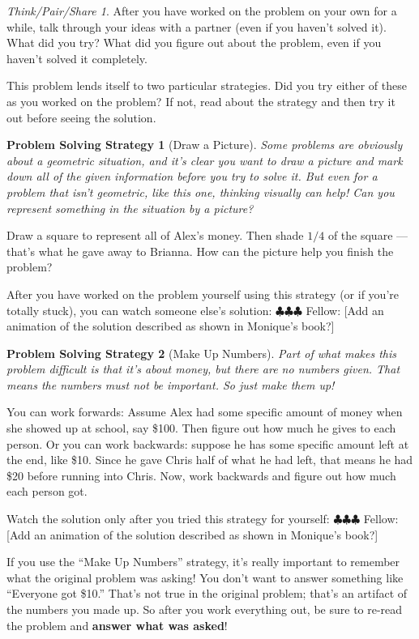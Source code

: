 \documentclass[10pt, reqno]{amsart}
\newtheorem{ps}{Problem Solving Strategy}
\theoremstyle{remark}
\newtheorem*{thinkpair*}{Think/Pair/Share}
\theoremstyle{definition}
\numberwithin{equation}{section}  %
\newcommand{\fellow}[1]{{\color{magenta} \sf $\clubsuit\clubsuit\clubsuit$ Fellow: [#1]}}
\begin{document}
\begin{thinkpair*}
After you have worked on the problem on your own for a while, talk through your ideas with a partner (even if you haven't solved it).  What did you try?   What did you figure out about the problem, even if you haven't solved it completely.
\end{thinkpair*}


This problem lends itself to two particular strategies.  Did you try either of these as you worked on the problem?  If not, read about the strategy and then try it out before seeing the solution.

\begin{ps}[Draw a Picture]
Some problems are obviously about a geometric situation, and it's clear you want to draw a picture and mark down all of the given information before you try to solve it.  But even for a problem that isn't geometric, like this one, thinking visually can help!  Can you represent something in the situation by a picture?  
\end{ps}

Draw a square to represent all of Alex's money.  Then shade $1/4$ of the square --- that's what he gave away to Brianna.  How can the picture help you finish the problem?

After you have worked on the problem yourself using this strategy (or if you're totally stuck), you can watch someone else's solution:
\fellow{Add an animation of the solution described as shown in Monique's book?}


\begin{ps}[Make Up Numbers]
Part of what makes this problem difficult is that it's about money, but there are no numbers given.  That means the numbers must not be important.  So just make them up!  
\end{ps}

You can  work forwards: Assume Alex had some specific amount of money when she showed up at school, say \$100.  Then figure out how much he gives to each person.  Or you can work backwards: suppose he has some specific amount left at the end, like \$10.  Since he gave Chris half of what he had left, that means he had \$20 before running into Chris.   Now, work backwards and figure out how much each person got.

Watch the solution only after you tried this strategy for yourself:
\fellow{Add an animation of the solution described as shown in Monique's book?}

If you use the ``Make Up Numbers'' strategy, it's really important to remember what the original problem was asking!  You don't want to answer something like ``Everyone got \$10.''  That's not true in the original problem; that's an artifact of the numbers you made up.  So after you work everything out, be sure to re-read the problem and {\bf answer what was asked}!
\end{document}

